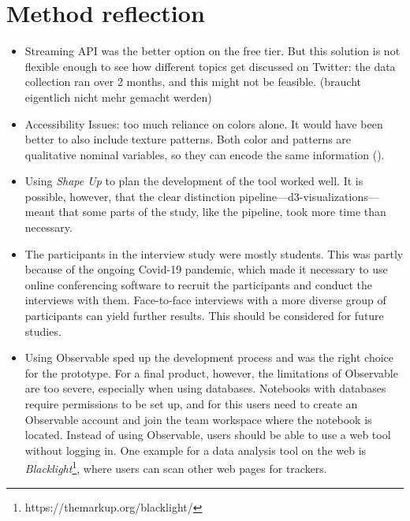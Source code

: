 \section{Method reflection}
\begin{itemize}
    \item Streaming API was the better option on the free tier. But this solution is not flexible enough to see how different topics get discussed on Twitter: the data collection ran over 2 months, and this might not be feasible. (braucht eigentlich nicht mehr gemacht werden)
    \item Accessibility Issues: too much reliance on colors alone. It would have been better to also include texture patterns. Both color and patterns are qualitative nominal variables, so they can encode the same information (\cite[1860]{borner2019}).
    \item Using \emph{Shape Up} to plan the development of the tool worked well. It is possible, however, that the clear distinction pipeline---d3-visualizations---meant that some parts of the study, like the pipeline, took more time than necessary.
    \item The participants in the interview study were mostly students. This was partly because of the ongoing Covid-19 pandemic, which made it necessary to use online conferencing software to recruit the participants and conduct the interviews with them. Face-to-face interviews with a more diverse group of participants can yield further results. This should be considered for future studies.
    \item Using Observable sped up the development process and was the right choice for the prototype. For a final product, however, the limitations of Observable are too severe, especially when using databases. Notebooks with databases require permissions to be set up, and for this users need to create an Observable account and join the team workspace where the notebook is located. Instead of using Observable, users should be able to use a web tool without logging in. One example for a data analysis tool on the web is \emph{Blacklight}\footnote{https://themarkup.org/blacklight/}, where users can scan other web pages for trackers.
\end{itemize}
